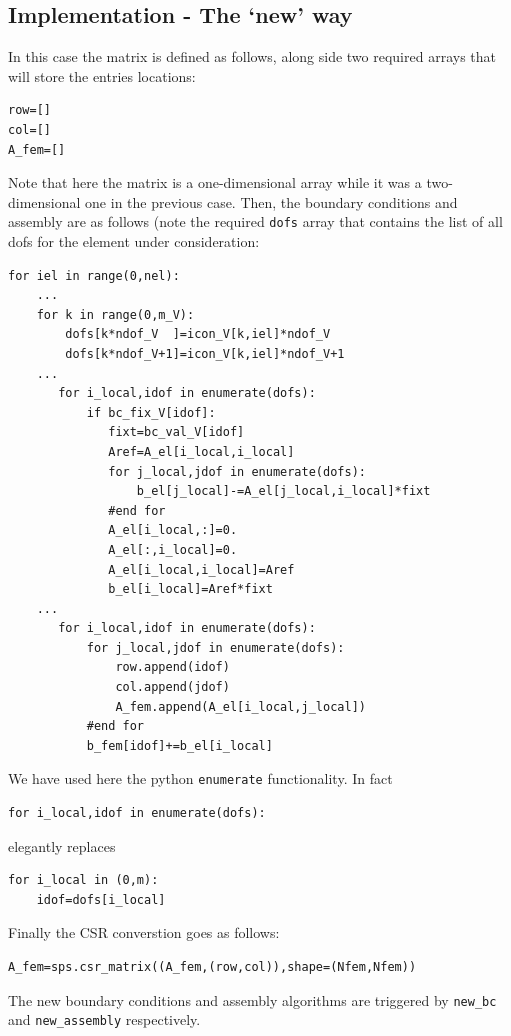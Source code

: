 \subsection*{Implementation - The `new' way}

In this case the matrix is defined as follows, along side two 
required arrays that will store the entries locations:
\begin{lstlisting}
row=[] 
col=[]
A_fem=[]
\end{lstlisting}
Note that here the matrix is a one-dimensional array
while it was a two-dimensional one in the previous case.
Then, the boundary conditions and assembly are as follows (note the required \lstinline{dofs}
array that contains the list of all dofs for the element under consideration:
\begin{lstlisting}
for iel in range(0,nel):
    ...
    for k in range(0,m_V):
        dofs[k*ndof_V  ]=icon_V[k,iel]*ndof_V
        dofs[k*ndof_V+1]=icon_V[k,iel]*ndof_V+1
    ...
       for i_local,idof in enumerate(dofs):
           if bc_fix_V[idof]: 
              fixt=bc_val_V[idof]
              Aref=A_el[i_local,i_local]
              for j_local,jdof in enumerate(dofs):
                  b_el[j_local]-=A_el[j_local,i_local]*fixt
              #end for
              A_el[i_local,:]=0.
              A_el[:,i_local]=0.
              A_el[i_local,i_local]=Aref
              b_el[i_local]=Aref*fixt
    ...
       for i_local,idof in enumerate(dofs):
           for j_local,jdof in enumerate(dofs):
               row.append(idof)
               col.append(jdof)
               A_fem.append(A_el[i_local,j_local])
           #end for
           b_fem[idof]+=b_el[i_local]
\end{lstlisting}
We have used here the python \lstinline{enumerate} functionality. In fact
\begin{lstlisting}
for i_local,idof in enumerate(dofs):
\end{lstlisting}
elegantly replaces
\begin{lstlisting}
for i_local in (0,m):
    idof=dofs[i_local]
\end{lstlisting}
Finally the CSR converstion goes as follows:
\begin{lstlisting}
A_fem=sps.csr_matrix((A_fem,(row,col)),shape=(Nfem,Nfem))
\end{lstlisting}

The new boundary conditions and assembly algorithms 
are triggered by \lstinline{new_bc} and \lstinline{new_assembly}
respectively.

